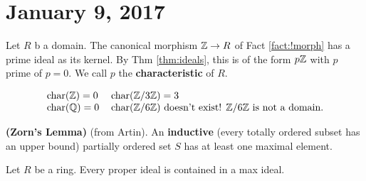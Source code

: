 \section{January 9, 2017}
\begin{defn}
    Let $R$ b a domain. The canonical morphism $\mathbb{Z} \rightarrow R$ of Fact \ref{fact:!morph} has
    a prime ideal as its kernel. By Thm \ref{thm:ideals}, this is of the form
    $p\mathbb{Z}$ with $p$ prime of $p = 0$. We call $p$ the \textbf{characteristic} of $R$.
\end{defn}
\begin{ex}
\[
\begin{tabular}{ll}
    char$(\ZZ) = 0$ & char$(\Zn 3) = 3$ \\
    char$(\QQ) = 0$ & char$(\Zn 6)$ doesn't exist! $\Zn 6 $ is not a domain.
\end{tabular}
\]
\end{ex}
\begin{unnumlemma}
\textbf{(Zorn's Lemma)} (from Artin). An \textbf{inductive} (every totally ordered
subset has an upper bound) partially ordered set $S$ has at least one maximal element.
\end{unnumlemma}
\begin{thm}
    Let $R$ be a ring. Every proper ideal is contained in a max ideal.
\end{thm}
